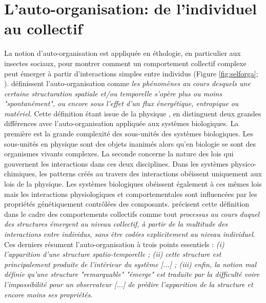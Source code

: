 	\section{L'auto-organisation: de l'individuel au collectif}
    \label{sec:autoorganisation}
La notion d'auto-organisation est appliquée en éthologie, en particulier aux insectes sociaux, pour montrer comment un comportement collectif complexe peut émerger à partir d'interactions simples entre individus (Figure \ref{fig:selforga}; \cite{camazine_self-organization_2001}). \citet{bonabeau_auto-organisation_1997} définissent l'auto-organisation comme \textit{les phénomènes au cours desquels une certaine structuration spatiale et/ou temporelle s'opère plus ou moins "spontanément", ou encore sous l'effet d'un flux énergétique, entropique ou matériel}. Cette définition étant issue de la physique \cite{bonabeau_self-organization_1997}, \citet{camazine_self-organization_2001} en distinguent deux grandes différences avec l'auto-organisation appliquée aux systèmes biologiques. La première est la grande complexité des sous-unités des systèmes biologiques. Les sous-unités en physique sont des objets inanimés alors qu'en biologie se sont des organismes vivants complexes. La seconde concerne la nature des lois qui gouvernent les interactions dans ces deux disciplines. Dans les systèmes physico-chimiques, les patterns créés au travers des interactions obéissent uniquement aux lois de la physique. Les systèmes biologiques obéissent également à ces mêmes lois mais les interactions physiologiques et comportementales sont influencées par les propriétés génétiquement contrôlées des composants. \citet{bonabeau_auto-organisation_1997} précisent cette définition dans le cadre des comportements collectifs comme tout \textit{processus au cours duquel des structures émergent au niveau collectif, à partir de la multitude des interactions entre individus, sans être codées explicitement au niveau individuel}. Ces derniers résument l'auto-organisation à trois points essentiels : \textit{(i) l'apparition d'une structure spatio-temporelle ; (ii) cette structure est principalement produite de l'intérieur du système [...] ; (iii) enfin, la notion mal définie qu'une structure "remarquable" "émerge" est traduite par la difficulté voire l'impossibilité pour un observateur [...] de prédire l'apparition de la structure et encore moins ses propriétés}. 

